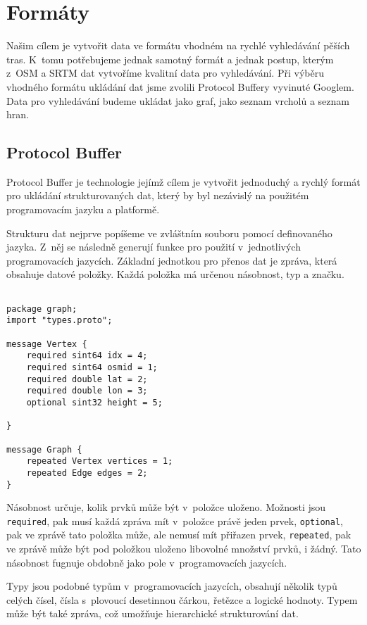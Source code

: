 \chapter{Formáty}
Našim cílem je vytvořit data ve formátu vhodném na rychlé vyhledávání pěších
tras. K~tomu potřebujeme jednak samotný formát a jednak postup, kterým z~OSM a
SRTM dat vytvoříme kvalitní data pro vyhledávání. Při výběru vhodného formátu
ukládání dat jsme zvolili Protocol Buffery\cite{pbfweb} vyvinuté Googlem. Data
pro vyhledávání budeme ukládat jako graf, jako seznam vrcholů a seznam hran.



\section{Protocol Buffer}
Protocol Buffer je technologie jejímž cílem je vytvořit jednoduchý a rychlý
formát pro ukládání strukturovaných dat, který by byl nezávislý na použitém 
programovacím jazyku a platformě. 

Strukturu dat nejprve popíšeme ve zvláštním souboru pomocí definovaného
jazyka\cite{pbfspec}. Z~něj se následně generují funkce pro použití
v~jednotlivých programovacích jazycích. Základní jednotkou pro přenos dat je
zpráva, která obsahuje datové položky. Každá položka má určenou násobnost, typ a
značku.

\begin{verbatim}

package graph;
import "types.proto";

message Vertex {
    required sint64 idx = 4;
    required sint64 osmid = 1;
    required double lat = 2;
    required double lon = 3;
    optional sint32 height = 5;
    
}

message Graph {
    repeated Vertex vertices = 1;
    repeated Edge edges = 2;
}
\end{verbatim}

{\tuc Násobnost} určuje, kolik prvků může být v~položce uloženo. Možnosti jsou
\verb|required|, pak musí každá zpráva mít v~položce právě jeden prvek,
\verb|optional|, pak ve zprávě tato položka může, ale nemusí mít přiřazen prvek,
\verb|repeated|, pak ve zprávě může být pod položkou uloženo libovolné množství
prvků, i žádný. Tato násobnost fugnuje obdobně jako pole v~programovacích
jazycích. 

{\tuc Typy} jsou podobné typům v~programovacích jazycích, obsahují několik typů celých
čísel, čísla s~plovoucí desetinnou čárkou, řetězce a logické hodnoty. Typem může
být také zpráva, což umožňuje hierarchické strukturování dat. 


